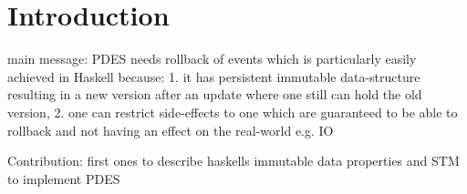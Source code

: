 \section{Introduction}
main message: PDES needs rollback of events which is particularly easily achieved in Haskell because: 1. it has persistent immutable data-structure resulting in a new version after an update where one still can hold the old version, 2. one can restrict side-effects to one which are guaranteed to be able to rollback and not having an effect on the real-world e.g. IO

Contribution: first ones to describe haskells immutable data properties and STM to implement PDES